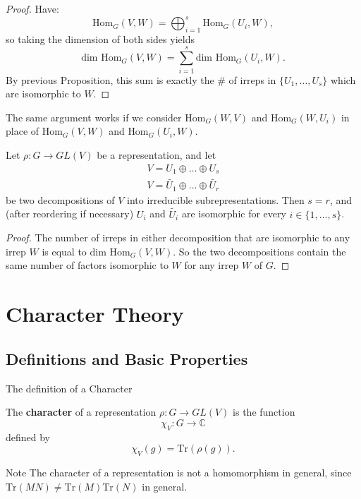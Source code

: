 \begin{frame}
\begin{proof}
Have:  \[ \text{Hom}_G(V,W) = \bigoplus_{i=1}^s \text{Hom}_G(U_i, W) ,\]
 so taking the dimension of both sides yields \[  \text{dim Hom}_G(V,W) = \sum_{i=1}^s \text{dim Hom}_G(U_i, W). \]
 By previous Proposition, this sum is exactly the \# of irreps in $\{ U_1, \ldots, U_s \}$ which are isomorphic to $W$.
\end{proof}
\end{frame}
\begin{note}
The same argument works if we consider $\text{Hom}_G(W,V)$ and $\text{Hom}_G(W,U_i)$ in place of $\text{Hom}_G(V,W)$ and $\text{Hom}_G(U_i,W)$.
\end{note}

\begin{frame}
\begin{theorem}
Let $\rho \colon G \to GL(V)$ be a representation, and let
\begin{align*}
V = U_1 \oplus \ldots \oplus U_s \\
V = \widetilde{U_1} \oplus \ldots \oplus \widetilde{U_r}
\end{align*}
be two decompositions of $V$ into irreducible subrepresentations.  Then $s = r$, and (after reordering if necessary) $U_i$ and $\widetilde{U_i}$ are isomorphic for every $i \in \{1, \ldots, s\}$.
\end{theorem}
\begin{proof}
The number of irreps in either decomposition that are isomorphic to any irrep $W$ is equal to $\text{dim Hom}_G(V,W)$.  So the two decompositions contain the same number of factors isomorphic to $W$ for any irrep $W$ of $G$.
\end{proof}
\end{frame}

\section{Character Theory}
\subsection{Definitions and Basic Properties}
\begin{frame}{The definition of a Character}
\begin{definition}
The \textbf{character} of a representation $\rho \colon G \to GL(V)$ is the function \[ \chi_V \colon G \to \mathbb{C}\] defined by \[\chi_V(g) = \text{Tr}(\rho(g)).\]
\end{definition}
\begin{block}{Note}
The character of a representation is not a homomorphism in general, since $\text{Tr}(MN) \neq \text{Tr}(M) \text{Tr}(N)$ in general.
\end{block}
\end{frame}

